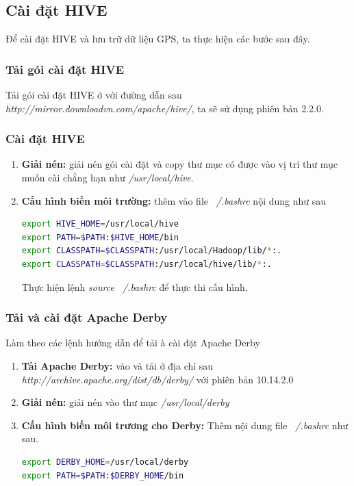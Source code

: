 	\subsection{Cài đặt HIVE}
	Để cài đặt HIVE và lưu trữ dữ liệu GPS, ta thực hiện các bước sau đây.
	\subsubsection{Tải gói cài đặt HIVE}
	Tải gói cài đặt HIVE ở với đường dẫn sau \textit{http://mirror.downloadvn.com/apache/hive/}, ta sẽ sử dụng phiên bản 2.2.0.
	\subsubsection{Cài đặt HIVE}
	\begin{enumerate}
		\item \textbf{Giải nén: }giải nén gói cài đặt và copy thư mục có được vào vị trí thư mục muốn cài chẳng hạn như \textit{/usr/local/hive}.
		\item \textbf{Cấu hình biến môi trường: }thêm vào file \textit{~/.bashrc} nội dung như sau
		\begin{lstlisting}[language=bash]
export HIVE_HOME=/usr/local/hive
export PATH=$PATH:$HIVE_HOME/bin
export CLASSPATH=$CLASSPATH:/usr/local/Hadoop/lib/*:.
export CLASSPATH=$CLASSPATH:/usr/local/hive/lib/*:.
	\end{lstlisting}
	Thực hiện lệnh \textit{source ~/.bashrc} để thực thi cấu hình.
	\end{enumerate}
	
	\subsubsection{Tải và cài đặt Apache Derby}
	Làm theo các lệnh hướng dẫn để tải à cài đặt Apache Derby
	\begin{enumerate}
		\item \textbf{Tải Apache Derby: } vào và tải ở địa chỉ sau \textit{http://archive.apache.org/dist/db/derby/} với phiên bản 10.14.2.0
		\item \textbf{Giải nén: } giải nén vào thư mục \textit{/usr/local/derby}
		\item \textbf{Cấu hình biến môi trương cho Derby:} Thêm nội dung file \textit{~/.bashrc} như sau.
		\begin{lstlisting}[language=bash]
export DERBY_HOME=/usr/local/derby
export PATH=$PATH:$DERBY_HOME/bin
		\end{lstlisting}
	\end{enumerate}
				
